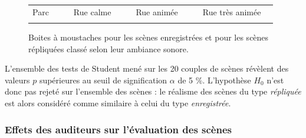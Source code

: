 \begin{figure}[ht]
\centering
{}

\begin{tabular}{|p{1.5cm}|l|p{0.001cm}|p{2cm}|l|p{0.001cm}|p{2cm}|l|p{0.001cm}|p{2.75cm}|l|}
\hhline{|-|-|~|-|-|~|-|-|~|-|-|}
Parc & {\cellcolor[HTML]{5AB25A}} & & Rue calme & {\cellcolor[HTML]{FFCB2F}} & & Rue animée & {\cellcolor[HTML]{F56B00}} & &  Rue très animée & {\cellcolor[HTML]{9A0000}}\\
\hhline{|-|-|~|-|-|~|-|-|~|-|-|}
\end{tabular}

\caption{Boites à moustaches pour les scènes enregistrées   et pour les scènes répliquées  classé selon leur ambiance sonore.}

\label{fig:boxplot_scene}
\end{figure}

L'ensemble des tests de Student mené sur les 20 couples de scènes révèlent des valeurs $p$ supérieures au seuil de signification $\alpha$ de 5 $\%$. L'hypothèse $H_0$ n'est donc pas rejeté sur l'ensemble des scènes : le réalisme des scènes du type \textit{répliquée} est alors considéré comme similaire à celui du type \textit{enregistrée}.  


\subsubsection{Effets des auditeurs sur l'évaluation des scènes}

